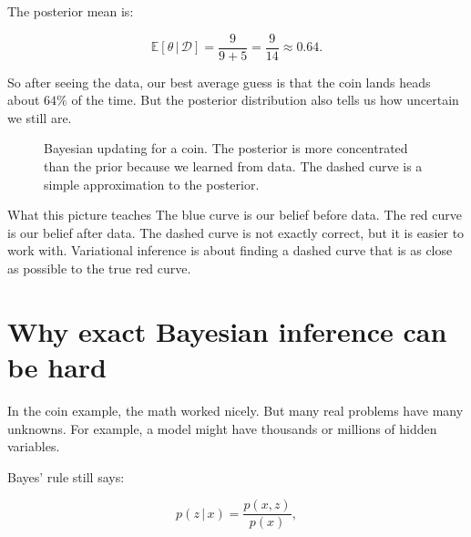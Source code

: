 \documentclass[11pt]{article}
\newcommand{\E}{\mathbb{E}}
\newcommand{\data}{\mathcal{D}}
\newcommand{\given}{\,|\,}
\begin{document}
The posterior mean is:

\[
\E[\theta \given \data] = \frac{9}{9+5} = \frac{9}{14} \approx 0.64.
\]

So after seeing the data, our best average guess is that the coin lands heads about $64\%$ of the time. But the posterior distribution also tells us how uncertain we still are.

\begin{figure}[h]
\centering
{}
\caption{Bayesian updating for a coin. The posterior is more concentrated than the prior because we learned from data. The dashed curve is a simple approximation to the posterior.}
\end{figure}

\begin{examplebox}{What this picture teaches}
The blue curve is our belief before data. The red curve is our belief after data. The dashed curve is not exactly correct, but it is easier to work with. Variational inference is about finding a dashed curve that is as close as possible to the true red curve.
\end{examplebox}

\section{Why exact Bayesian inference can be hard}

In the coin example, the math worked nicely. But many real problems have many unknowns.
For example, a model might have thousands or millions of hidden variables.

Bayes' rule still says:

\[
p(z \given x) = \frac{p(x,z)}{p(x)},
\]
\end{document}
